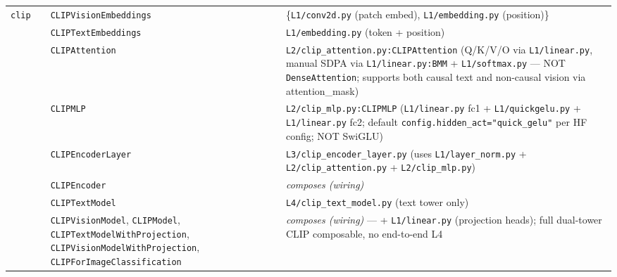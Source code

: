 \documentclass[10pt]{article}
\newcommand{\cmark}{\ding{51}}
\begin{document}
{\begin{longtable}{@{}p{1.6cm} c p{4.0cm} p{14.5cm}@{}}
\multirow{8}{*}{\texttt{clip}} & \multirow{8}{*}{\cmark}
   & \texttt{CLIPVisionEmbeddings}    & \{\texttt{L1/conv2d.py} (patch embed), \texttt{L1/embedding.py} (position)\} \\
&& \texttt{CLIPTextEmbeddings}        & \texttt{L1/embedding.py} (token + position) \\
&& \texttt{CLIPAttention}             & \texttt{L2/clip\_attention.py:CLIPAttention} (Q/K/V/O via \texttt{L1/linear.py}, manual SDPA via \texttt{L1/linear.py:BMM} + \texttt{L1/softmax.py} --- NOT \texttt{DenseAttention}; supports both causal text and non-causal vision via attention\_mask) \\
&& \texttt{CLIPMLP}                   & \texttt{L2/clip\_mlp.py:CLIPMLP} (\texttt{L1/linear.py} fc1 + \texttt{L1/quickgelu.py} + \texttt{L1/linear.py} fc2; default \texttt{config.hidden\_act="quick\_gelu"} per HF config; NOT SwiGLU) \\
&& \texttt{CLIPEncoderLayer}          & \texttt{L3/clip\_encoder\_layer.py} (uses \texttt{L1/layer\_norm.py} + \texttt{L2/clip\_attention.py} + \texttt{L2/clip\_mlp.py}) \\
&& \texttt{CLIPEncoder}               & \textit{composes (wiring)} \\
&& \texttt{CLIPTextModel}             & \texttt{L4/clip\_text\_model.py} (text tower only) \\
&& \texttt{CLIPVisionModel}, \texttt{CLIPModel}, \texttt{CLIPTextModelWithProjection}, \texttt{CLIPVisionModelWithProjection}, \texttt{CLIPForImageClassification} & \textit{composes (wiring)} --- + \texttt{L1/linear.py} (projection heads); full dual-tower CLIP composable, no end-to-end L4 \\
\midrule


\end{longtable}}
\end{document}

